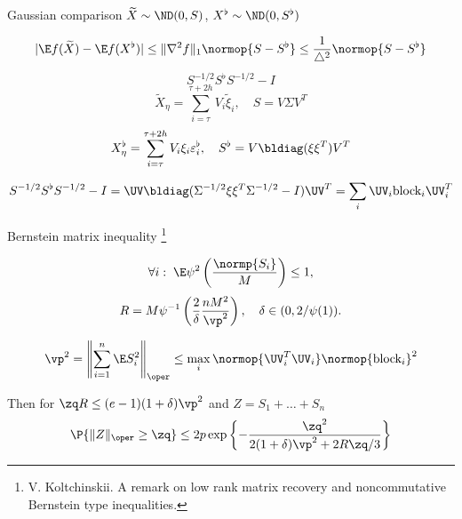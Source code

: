 \documentclass[9pt,english]{beamer}   %
\begin{document}
\begin{frame}{Gaussian comparison $\widetilde{X} \sim \ND (0, S) $, $X^{\flat} \sim \ND (0, S^{\flat}) $ }

\[
| \E f(\widetilde{X}) - \E f(X^{\flat}) | \leq  \| \nabla^2 f \|_1 
\normop{ S - S^{\flat} } \leq \frac{1}{\triangle^2}
\normop{ S - S^{\flat} }
\] 
\[
S^{-1/2} S^{\flat}  S^{-1/2} - I
\] 
\[
 \widetilde{X}_{\eta}  = \sum_{i = \tau}^{\tau + 2h} V_i \widetilde{\xi}_{i} 
 , \quad
 S = V \Sigma  V^{T}
 \]\[
  X^{\flat}_{\eta}  =\sum_{i = \tau}^{\tau + 2h} V_i \xi_{i} \varepsilon_i^{\flat},
  \quad
  S^{\flat} = V \bldiag(\xi \xi^{T}) V^{T}
\] 

\[
S^{-1/2} S^{\flat}  S^{-1/2} - I =  \UV \bldiag( \Sigma^{-1/2} \xi \xi^{T} \Sigma^{-1/2} - I ) \UV^T = \sum_i  \UV_i \text{block}_i \UV_i^T
\]


\end{frame}

\begin{frame}{ Bernstein matrix inequality \footnote{V. Koltchinskii. A remark on low rank matrix recovery and noncommutative Bernstein type inequalities.} }

\[
\forall i: \; \E \psi^2 \left( \frac{\normp{S_i}}{M} \right) \leq 1, 
\]
\[
 R = M \psi^{-1} \left( \frac{2}{\delta} \frac{n M^2}{ \vp^{2}  } \right ),
 \quad
 \delta \in (0, 2/\psi(1)).
\]

\[
\vp^{2} 
	=
	\left\|\sum_{i=1}^{n}\E S_{i}^{2}\right\|_{\oper} 
	\leq  \max_i  \normop{ \UV_i^T \UV_i } \normop{\text{block}_i  }^2
\]

Then for $\zq R \leq (e - 1)(1 + \delta) \vp^{2}$ and $Z = S_1 + \ldots + S_n$ 
\[
\P\{\| Z \|_{\oper} \geq \zq \} \leq 2p \exp \left \{ - \frac{\zq^2}{ 2(1 + \delta) \vp^2 + 2R \zq/3 } \right \} 
\]



\end{frame}
\end{document}
